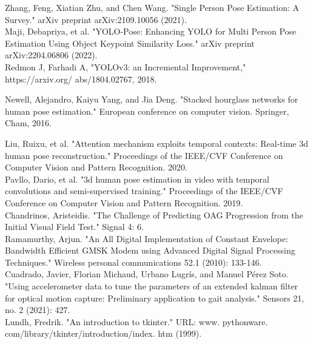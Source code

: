 \begin{thebibliography}{9}
Zhang, Feng, Xiatian Zhu, and Chen Wang. "Single Person Pose Estimation: A Survey." arXiv preprint arXiv:2109.10056 (2021).\\

Maji, Debapriya, et al. "YOLO-Pose: Enhancing YOLO for Multi Person Pose Estimation Using Object Keypoint Similarity Loss." arXiv preprint arXiv:2204.06806 (2022).\\

Redmon J, Farhadi A, "YOLOv3: an Incremental Improvement," https://arxiv.org/
abs/1804.02767, 2018.

Newell, Alejandro, Kaiyu Yang, and Jia Deng. "Stacked hourglass networks for human pose estimation." European conference on computer vision. Springer, Cham, 2016.

Liu, Ruixu, et al. "Attention mechanism exploits temporal contexts: Real-time 3d human pose reconstruction." Proceedings of the IEEE/CVF Conference on Computer Vision and Pattern Recognition. 2020.\\

Pavllo, Dario, et al. "3d human pose estimation in video with temporal convolutions and semi-supervised training." Proceedings of the IEEE/CVF Conference on Computer Vision and Pattern Recognition. 2019.\\

Chandrinos, Aristeidis. "The Challenge of Predicting OAG Progression from the Initial Visual Field Test." Signal 4: 6.\\

Ramamurthy, Arjun. "An All Digital Implementation of Constant Envelope: Bandwidth Efficient GMSK Modem using Advanced Digital Signal Processing Techniques." Wireless personal communications 52.1 (2010): 133-146.\\

Cuadrado, Javier, Florian Michaud, Urbano Lugrís, and Manuel Pérez Soto. "Using accelerometer data to tune the parameters of an extended kalman filter for optical motion capture: Preliminary application to gait analysis." Sensors 21, no. 2 (2021): 427.\\

Lundh, Fredrik. "An introduction to tkinter." URL: www. pythonware. com/library/tkinter/introduction/index. htm (1999).\\


\end{thebibliography}
